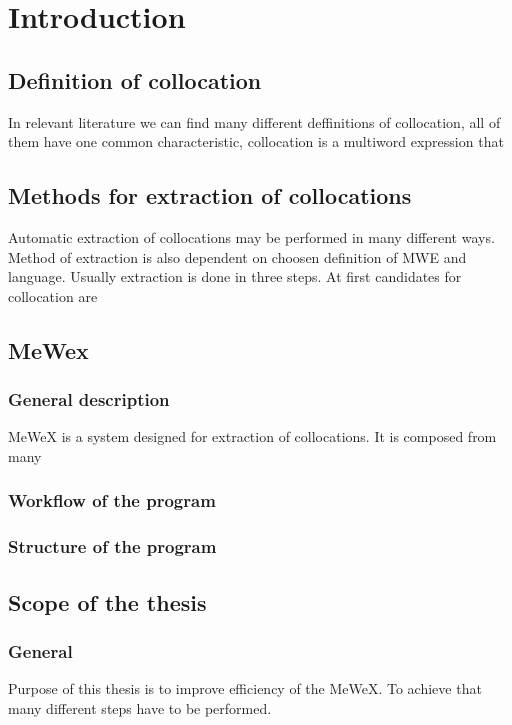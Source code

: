 
\chapter{Introduction}

\section{Definition of collocation}
In relevant literature we can find many different deffinitions of collocation, all of them have one common characteristic, collocation is a multiword expression that 

\section{Methods for extraction of collocations}
Automatic extraction of collocations may be performed in many different ways. Method of extraction is also dependent on choosen definition of MWE and language. Usually extraction is done in three steps. At first candidates for collocation are 

\section{MeWex}

\subsection{General description}
MeWeX is a system designed for extraction of collocations. It is composed from many

\subsection{Workflow of the program}

\subsection{Structure of the program}

\section{Scope of the thesis}

\subsection{General}
Purpose of this thesis is to improve efficiency of the MeWeX. To achieve that many different steps have to be performed.

